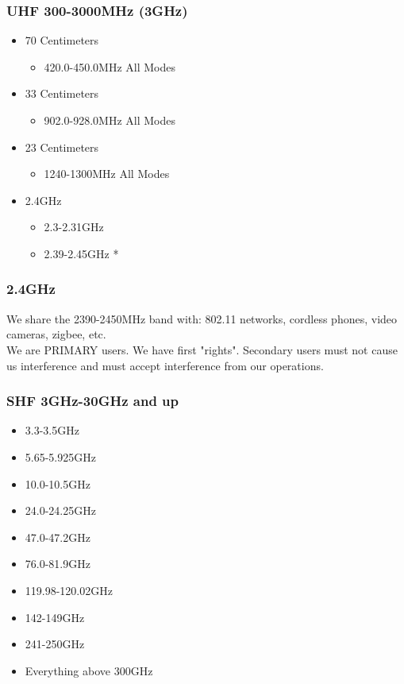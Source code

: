 \documentclass[12pt]{beamer}
\begin{document}
\begin{frame}
\frametitle{UHF 300-3000MHz (3GHz)}
\begin{itemize}
\item 70 Centimeters
\begin{itemize}
\item 420.0-450.0MHz All Modes
\end{itemize}
\item 33 Centimeters
\begin{itemize}
\item 902.0-928.0MHz All Modes
\end{itemize}
\item 23 Centimeters
\begin{itemize}
\item 1240-1300MHz All Modes
\end{itemize}
\item 2.4GHz
\begin{itemize}
\item 2.3-2.31GHz
\item 2.39-2.45GHz *
\end{itemize}
\end{itemize}
\end{frame}

\begin{frame}
\frametitle{2.4GHz}
We share the 2390-2450MHz band with: 802.11 networks, cordless phones, video cameras, zigbee, etc.\ \\
We are PRIMARY users. We have first "rights". Secondary users must not cause us interference and must accept interference from our operations.
\end{frame}

\begin{frame}
\frametitle{SHF 3GHz-30GHz and up}
\begin{itemize}
\item 3.3-3.5GHz
\item  5.65-5.925GHz
\item  10.0-10.5GHz
\item  24.0-24.25GHz
\item  47.0-47.2GHz
\item  76.0-81.9GHz
\item  119.98-120.02GHz
\item  142-149GHz
\item  241-250GHz
\item  Everything above 300GHz
\end{itemize}
\end{frame}
\end{document}
